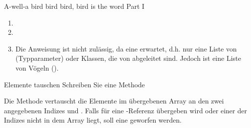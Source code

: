\documentclass{../tuda-exercise}
\begin{document}
\begin{task}[credit=\stars{1}{3}]{A-well-a bird bird bird, bird is the word Part I}
    \begin{solution}
      \begin{enumerate}
        [label=(\arabic*):]
        \item\hfill
        
        \item\hfill
        
        \item Die Anweisung ist nicht zulässig, da
        \href{https://docs.oracle.com/en/java/javase/11/docs/api/java.base/java/util/Collection.html#addAll(java.util.Collection)}
        {} eine  erwartet, d.h. nur
        eine Liste von  (Typparameter) oder Klassen, die von 
        abgeleitet sind. Jedoch ist  eine Liste von Vögeln ().
      \end{enumerate}
    \end{solution}
  \end{task}

  \begin{task}[credit=\stars{1}{3}]{Elemente tauschen}
    Schreiben Sie eine Methode

    \begin{center}
    \end{center}

    Die Methode vertauscht die Elemente im übergebenen Array  an den zwei
    angegebenen Indizes  und . Falls für  eine
    -Referenz übergeben wird oder einer der Indizes nicht in dem Array liegt,
    soll eine  geworfen werden.

    \begin{solution}
      
    \end{solution}
  \end{task}

  \clearpage
\end{document}
